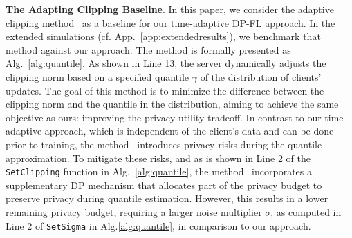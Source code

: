 

{\textbf{The Adapting Clipping Baseline}. In this paper, we consider the adaptive clipping method~\citep{andrew2021differentially} as a baseline for our time-adaptive DP-FL approach. In the extended simulations (cf. App.~\ref{app:extendedresults}), we benchmark that method against our approach. The method is formally presented as Alg.~\ref{alg:quantile}. As shown in Line 13, the server dynamically adjusts the clipping norm based on a specified quantile $\gamma$ of the distribution of clients’ updates. The goal of this method is to minimize the difference between the clipping norm and the quantile in the distribution, aiming to achieve the same objective as ours: improving the privacy-utility tradeoff. In contrast to our time-adaptive approach, which is independent of the client's data and can be done prior to training, the method~\citep{andrew2021differentially} introduces privacy risks during the quantile approximation. To mitigate these risks, and as is shown in Line 2 of the \texttt{SetClipping} function in Alg.~\ref{alg:quantile}, the method~\citep{andrew2021differentially} incorporates a supplementary DP mechanism that allocates part of the privacy budget to preserve privacy during quantile estimation. However, this results in a lower remaining privacy budget, requiring a larger noise multiplier $\sigma$, as computed in Line 2 of \texttt{SetSigma} in Alg.\ref{alg:quantile}, in comparison to our approach. }




